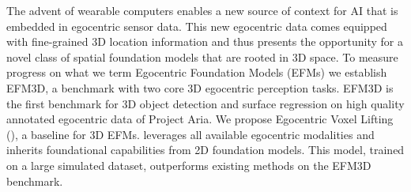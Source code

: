 



The advent of wearable computers enables a new source of context for AI that is embedded in egocentric sensor data. This new egocentric data comes equipped with fine-grained 3D location information and thus presents the opportunity for a novel class of spatial foundation models that are rooted in 3D space. 
To measure progress on what we term Egocentric Foundation Models (EFMs) we establish EFM3D, a benchmark with two core 3D egocentric perception tasks. EFM3D is the first benchmark for 3D object detection and surface regression on high quality annotated egocentric data of Project Aria. We propose Egocentric Voxel Lifting (\EVL{}), a baseline for 3D EFMs. \EVL{} leverages all available egocentric modalities and inherits foundational capabilities from 2D foundation models. This model, trained on a large simulated dataset, outperforms existing methods on the EFM3D benchmark.



